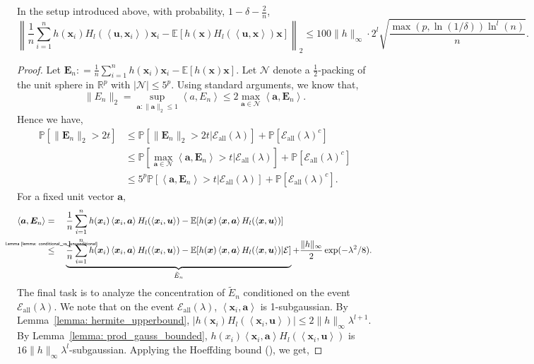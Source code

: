 \documentclass[final,12pt]{colt2018} %
\newcommand{\E}{\mathbb{E}}
\newcommand{\Prob}{\mathbb{P}}
\newcommand{\R}{\mathbb{R}}
\newcommand{\explain}[2]{\mathrel{\overset{\makebox[0pt]{\mbox{\normalfont\tiny\sffamily #1}}}{#2}}}
\renewcommand\v[1]{{\ensuremath{\boldsymbol{#1}}}}
\newcommand\ip[1]{\left\langle #1 \right\rangle}
\begin{document}
\begin{lemma} In the setup introduced above, with probability, $1- \delta - \frac{2}{n}$, 
$$ \left\| \frac{1}{n} \sum_{i=1}^n h(\v x_i) H_l(\ip{\v u, \v x_i}) \v x_i - \E[h(\v x) H_l(\ip{\v u, \v x}) \v x ] \right\|_2 \leq 100 \|h\|_\infty \cdot 2^l \sqrt{\frac{\max(p,\ln(1/\delta)) \ln^l(n)}{n}}.$$
\label{lemma: bounded_h_concentration}
\end{lemma}
\begin{proof}
Let $\v E_n : = \frac{1}{n} \sum_{i=1}^n h(\v x_i) \v x_i - \E[h(\v x) \v x ] $. Let $\mathcal{N}$ denote a $\frac{1}{2}$-packing of the unit sphere in $\R^p$ with $|\mathcal{N}| \leq 5^p$. Using standard arguments, we know that,
$$ \| E_n \|_2 = \sup_{\v a: \|\v a\|_2 \leq 1} \ip{a, E_n}  \leq 2 \max_{\v a \in \mathcal{N}} \ip{\v a, \v E_n}.$$
Hence we have,
\begin{align}
    \Prob \left[ \| \v E_n \|_2 > 2 t \right] & \leq \Prob[ \| \v E_n \|_2 > 2 t | \mathcal{E}_\text{all}(\lambda)] + \Prob[\mathcal{E}_\text{all}(\lambda)^c]\\
    & \leq \Prob \left[ \max_{\v a \in \mathcal{N}} \ip{\v a, \v E_n} > t | \mathcal{E}_\text{all}(\lambda) \right] + \Prob[\mathcal{E}_\text{all}(\lambda)^c] \nonumber\\
    & \leq 5^p \Prob \left[  \ip{\v a, \v E_n} > t | \mathcal{E}_\text{all}(\lambda) \right] + \Prob[\mathcal{E}_\text{all}(\lambda)^c]. \label{equation: bounded_h_concentration_eps_net}
\end{align}
For a fixed unit vector $\v a$, 
\begin{align*}
\ip{\v a, \v E_n} & = \quad \frac{1}{n} \sum_{i=1}^n h(\v x_i) \ip{\v x_i, \v a} H_l(\ip{\v x_i, \v u}) - \E[h(\v x)\ip{\v x, \v a} H_l(\ip{\v x, \v u})]  \\
& \explain{Lemma~\ref{lemma: conditional_vs_unconditional}}{\leq} \quad \underbrace{ \frac{1}{n} \sum_{i=1}^n h(\v x_i) \ip{\v x_i, \v a} H_l(\ip{\v x_i, \v u}) - \E[h(\v x)\ip{\v x, \v a} H_l(\ip{\v x, \v u}) | \mathcal{E}]}_{\tilde{E}_n} + \frac{\|h\|_\infty}{2}\exp(-\lambda^2/8).
\end{align*}
The final task is to analyze the concentration of $\tilde{E}_n$ conditioned on the event $\mathcal{E}_\text{all}(\lambda)$. We note that on the event $\mathcal{E}_\text{all}(\lambda)$, $\ip{\v x_i,\v a}$ is 1-subgaussian. By Lemma~\ref{lemma: hermite_upperbound}, $|h(\v x_i) H_l(\ip{\v x_i, \v u})| \leq 2\|h\|_\infty  \lambda^{l+1}$. By Lemma~\ref{lemma: prod_gauss_bounded}, $h(x_i)\ip{\v x_i, \v a}H_l(\ip{\v x_i, \v u})$ is $16\|h\|_\infty\lambda^l$-subgaussian. Applying the Hoeffding bound (), we get,

\end{proof}
\end{document}
